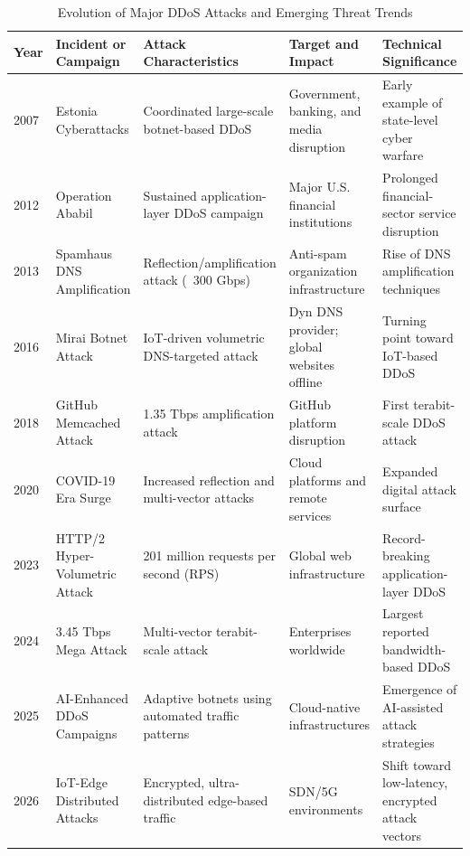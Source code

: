\documentclass[ASNA,twocolumn]{USG} %
\begin{document}
\begin{table}[htb!]
\centering
\caption{Evolution of Major DDoS Attacks and Emerging Threat Trends}
\label{tab:ddos_evolution}
\renewcommand{\arraystretch}{1.2}
\begin{tabular}{|p{1cm}|p{2.6cm}|p{3.5cm}|p{3.5cm}|p{3.5cm}|}
\hline
\textbf{Year} & \textbf{Incident or Campaign} & \textbf{Attack Characteristics} & \textbf{Target and Impact} & \textbf{Technical Significance} \\
\hline

2007 & Estonia Cyberattacks & Coordinated large-scale botnet-based DDoS & Government, banking, and media disruption & Early example of state-level cyber warfare \\
\hline

2012 & Operation Ababil & Sustained application-layer DDoS campaign & Major U.S. financial institutions & Prolonged financial-sector service disruption \\
\hline

2013 & Spamhaus DNS Amplification & Reflection/amplification attack (~300 Gbps) & Anti-spam organization infrastructure & Rise of DNS amplification techniques \\
\hline

2016 & Mirai Botnet Attack & IoT-driven volumetric DNS-targeted attack & Dyn DNS provider; global websites offline & Turning point toward IoT-based DDoS \\
\hline

2018 & GitHub Memcached Attack & 1.35 Tbps amplification attack & GitHub platform disruption & First terabit-scale DDoS attack \\
\hline

2020 & COVID-19 Era Surge & Increased reflection and multi-vector attacks & Cloud platforms and remote services & Expanded digital attack surface \\
\hline

2023 & HTTP/2 Hyper-Volumetric Attack & 201 million requests per second (RPS) & Global web infrastructure & Record-breaking application-layer DDoS \\
\hline

2024 & 3.45 Tbps Mega Attack & Multi-vector terabit-scale attack & Enterprises worldwide & Largest reported bandwidth-based DDoS \\
\hline

2025 & AI-Enhanced DDoS Campaigns & Adaptive botnets using automated traffic patterns & Cloud-native infrastructures & Emergence of AI-assisted attack strategies \\
\hline

2026 & IoT-Edge Distributed Attacks & Encrypted, ultra-distributed edge-based traffic & SDN/5G environments & Shift toward low-latency, encrypted attack vectors \\
\hline

\end{tabular}
\end{table}
\end{document}
